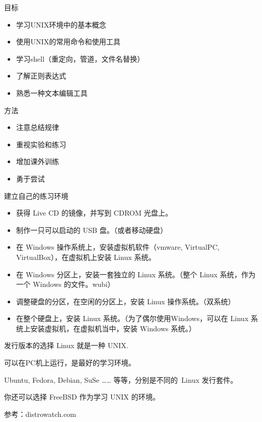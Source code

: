 \begin{frame}{目标}
\begin{itemize}
  \item 学习UNIX环境中的基本概念
  \item 使用UNIX的常用命令和使用工具
  \item 学习shell（重定向，管道，文件名替换）
  \item 了解正则表达式
  \item 熟悉一种文本编辑工具
\end{itemize}
\end{frame}

\begin{frame}{方法}
\begin{itemize}
  \item 注意总结规律
  \item 重视实验和练习
  \item 增加课外训练
  \item 勇于尝试
\end{itemize}
\end{frame}

\begin{frame}[<+->]{建立自己的练习环境}
    \begin{itemize}
        \item 获得 Live CD 的镜像，并写到 CDROM 光盘上。
        \item 制作一只可以启动的 USB 盘。（或者移动硬盘）
        \item 在 Windows 操作系统上，安装虚拟机软件（vmware, VirtualPC, VirtualBox），在虚拟机上安装 Linux 系统。
        \item 在 Windows 分区上，安装一套独立的 Linux 系统。（整个 Linux 系统，作为一个 Windows 的文件。wubi）
        \item 调整硬盘的分区，在空闲的分区上，安装 Linux 操作系统。（双系统）
        \item 在整个硬盘上，安装 Linux 系统。（为了偶尔使用Windows，可以在 Linux 系统上安装虚拟机，在虚拟机当中，安装 Windows 系统。）
    \end{itemize}
\end{frame}

\begin{frame}{发行版本的选择}
Linux 就是一种 UNIX.

可以在PC机上运行，是最好的学习环境。

Ubuntu, Fedora, Debian, SuSe …… 等等，分别是不同的~Linux 发行套件。

你还可以选择 FreeBSD 作为学习 UNIX 的环境。

参考：distrowatch.com
\end{frame}

